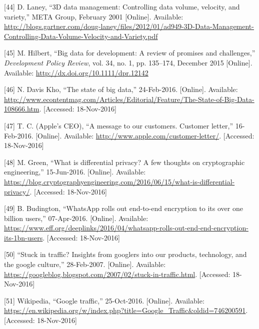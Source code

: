 \documentclass[12pt,english,a4paper,titlepage,cleardoublepage=empty,dottedtoc]{report}
\begin{document}
\hypertarget{ref-report_2001_3d-data-management-controlling-data-volume-velocity-and-variety}{}
{[}44{]} D. Laney, ``3D data management: Controlling data volume,
velocity, and variety,'' META Group, February 2001 {[}Online{]}.
Available:
\url{http://blogs.gartner.com/doug-laney/files/2012/01/ad949-3D-Data-Management-Controlling-Data-Volume-Velocity-and-Variety.pdf}

\hypertarget{ref-paper_2015_big-data-for-development-a-review-of-promises-and-challenges:more-data}{}
{[}45{]} M. Hilbert, ``Big data for development: A review of promises
and challenges,'' \emph{Development Policy Review}, vol. 34, no. 1, pp.
135--174, December 2015 {[}Online{]}. Available:
\url{http://dx.doi.org/10.1111/dpr.12142}

\hypertarget{ref-web_2016_the-state-of-big-data}{}
{[}46{]} N. Davis Kho, ``The state of big data,'' 24-Feb-2016.
{[}Online{]}. Available:
\url{http://www.econtentmag.com/Articles/Editorial/Feature/The-State-of-Big-Data-108666.htm}.
{[}Accessed: 18-Nov-2016{]}

\hypertarget{ref-web_2016_apple_customer-letter}{}
{[}47{]} T. C. (Apple's CEO), ``A message to our customers. Customer
letter,'' 16-Feb-2016. {[}Online{]}. Available:
\url{http://www.apple.com/customer-letter/}. {[}Accessed: 18-Nov-2016{]}

\hypertarget{ref-web_2016_what-is-differential-privacy}{}
{[}48{]} M. Green, ``What is differential privacy? A few thoughts on
cryptographic engineering,'' 15-Jun-2016. {[}Online{]}. Available:
\url{https://blog.cryptographyengineering.com/2016/06/15/what-is-differential-privacy/}.
{[}Accessed: 18-Nov-2016{]}

\hypertarget{ref-web_2016_eff_whatsapp-rolls-out-emd-to-end-encryption}{}
{[}49{]} B. Budington, ``WhatsApp rolls out end-to-end encryption to its
over one billion users,'' 07-Apr-2016. {[}Online{]}. Available:
\url{https://www.eff.org/deeplinks/2016/04/whatsapp-rolls-out-end-end-encryption-its-1bn-users}.
{[}Accessed: 18-Nov-2016{]}

\hypertarget{ref-web_2007_introducing-google-traffic}{}
{[}50{]} ``Stuck in traffic? Insights from googlers into our products,
technology, and the google culture,'' 28-Feb-2007. {[}Online{]}.
Available:
\url{https://googleblog.blogspot.com/2007/02/stuck-in-traffic.html}.
{[}Accessed: 18-Nov-2016{]}

\hypertarget{ref-web_2016_wikipedia_google-traffic}{}
{[}51{]} Wikipedia, ``Google traffic,'' 25-Oct-2016. {[}Online{]}.
Available:
\url{https://en.wikipedia.org/w/index.php?title=Google_Traffic\&oldid=746200591}.
{[}Accessed: 18-Nov-2016{]}
\end{document}
